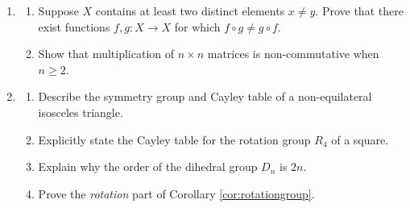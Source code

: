 \begin{exercises}
\begin{enumerate}
	  
	  \item\begin{enumerate}%
		  \item\label{exs:funcnoncomm} Suppose $X$ contains at least two distinct elements $x\neq y$. Prove that there exist functions $f,g:X\to X$ for which $f\circ g\neq g\circ f$.
		  
			\item Show that multiplication of $n\times n$ matrices is non-commutative when $n\ge 2$.
		\end{enumerate}
	  
	  
	  \item\begin{enumerate}
	    \item Describe the symmetry group and Cayley table of a non-equilateral isosceles triangle.
	    
	    \item\label{exs:squarerot} Explicitly state the Cayley table for the rotation group $R_4$ of a square.
	    
	    \item Explain why the order of the dihedral group $D_n$ is $2n$.
	    
	    \item Prove the \emph{rotation} part of Corollary \ref{cor:rotationgroup}.
	  \end{enumerate}
		
		
	  
	
	

\end{enumerate}
\end{exercises}
